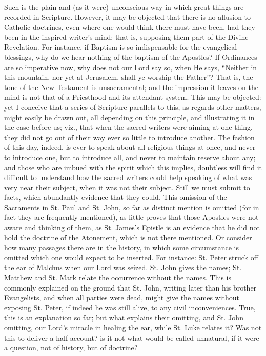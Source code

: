 Such is the plain and (as it were) unconscious way in which great
things are recorded in Scripture. However, it may be objected that
there is no allusion to Catholic doctrines, even where one would think
there must have been, had they been in the inspired writer's mind;
that is, supposing them part of the Divine Revelation. For instance,
if Baptism is so indispensable for the evangelical blessings, why do
we hear nothing of the baptism of the Apostles? If Ordinances are so
imperative now, why does not our Lord say so, when He says,
``Neither in this mountain, nor yet at Jerusalem, shall ye worship
the Father''? That is, the tone of the New Testament is
unsacramental; and the impression it leaves on the mind is not that of
a Priesthood and its attendant system. This may be objected: yet I
conceive that a series of Scripture parallels to this, as regards
other matters, might easily be drawn out, all depending on this
principle, and illustrating it in the case before us; viz., that when
the sacred writers were aiming at one thing, they did not go out of
their way ever so little to introduce another. The fashion of this
day, indeed, is ever to speak about all religious things at once, and
never to introduce one, but to introduce all, and never to maintain
reserve about any; and those who are imbued with the spirit which this
implies, doubtless will find it difficult to understand how the sacred
writers could help speaking of what was very near their subject, when
it was not their subject. Still we must submit to facts, which
abundantly evidence that they could. This omission of the Sacraments
in St. Paul and St. John, so far as distinct mention is omitted
(for in fact they are frequently mentioned), as little proves that
those Apostles were not aware and thinking of them, as St. James's
Epistle is an evidence that he did not hold the doctrine of the
Atonement, which is not there mentioned. Or consider how many passages
there are in the history, in which some circumstance is omitted which
one would expect to be inserted. For instance: St. Peter struck off
the ear of Malchus when our Lord was seized. St. John gives the names;
St. Matthew and St. Mark relate the occurrence without the names. This
is commonly explained on the ground that St. John, writing later than
his brother Evangelists, and when all parties were dead, might give
the names without exposing St. Peter, if indeed he was still alive, to
any civil inconveniences. True, this is an explanation so far; but
what explains their omitting, and St. John omitting, our Lord's
miracle in healing the ear, while St. Luke relates it? Was not this to
deliver a half account? is it not what would be called unnatural, if
it were a question, not of history, but of doctrine?

